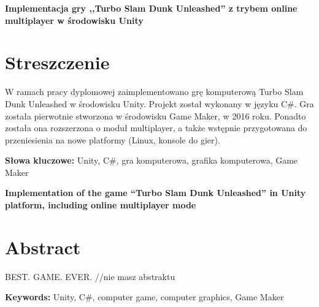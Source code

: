 \newpage
\begin{center}
\large \bf
Implementacja gry ,,Turbo Slam Dunk Unleashed'' z trybem online multiplayer w środowisku Unity
\end{center}

\section*{Streszczenie}
W ramach pracy dyplomowej zaimplementowano grę komputerową Turbo Slam Dunk Unleashed w środowisku Unity. Projekt został wykonany w języku C\#. Gra została pierwotnie stworzona w środowisku Game Maker, w 2016 roku. Ponadto została ona rozszerzona o moduł multiplayer, a także wstępnie przygotowana do przeniesienia na nowe platformy (Linux, konsole do gier).

\bigskip
{\noindent\bf Słowa kluczowe:} Unity, C\#, gra komputerowa, grafika komputerowa, Game Maker

\vskip 2cm


\begin{center}
\large \bf
Implementation of the game ``Turbo Slam Dunk Unleashed'' in Unity platform, including online multiplayer mode 
\end{center}

\section*{Abstract}
BEST. GAME. EVER. //nie masz abstraktu

\bigskip
{\noindent\bf Keywords:} Unity, C\#, computer game, computer graphics, Game Maker

\vfill